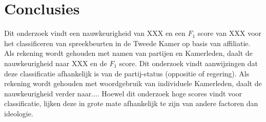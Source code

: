 \section{Conclusies}
\label{sec:conc}

Dit onderzoek vindt een nauwkeurigheid van XXX en een $F_1$ score van XXX voor het classificeren van spreekbeurten in de Tweede Kamer op basis van affiliatie. Als rekening wordt gehouden met namen van partijen en Kamerleden, daalt de nauwkeurigheid naar XXX en de $F_1$ score. Dit onderzoek vindt aanwijzingen dat deze classificatie afhankelijk is van de partij-status (oppositie of regering). Als rekening wordt gehouden met woordgebruik van individuele Kamerleden, daalt de nauwkeurigheid verder naar.... Hoewel dit onderzoek hoge scores vindt voor classificatie, lijken deze in grote mate afhankelijk te zijn van andere factoren dan ideologie.